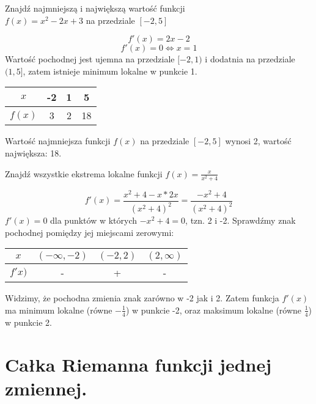 \documentclass[main.tex]{subfiles}
\begin{document}
    \begin{exercise}
        Znajdź najmniejszą i największą wartość funkcji\\ $f(x) = x^2 - 2x + 3$ na przedziale $[-2, 5]$
    \end{exercise}

    \[f'(x) = 2x - 2\]
    \[f'(x) = 0 \Leftrightarrow x = 1\]
    Wartość pochodnej jest ujemna na przedziale $[-2, 1)$ i dodatnia na przedziale $(1, 5]$, zatem istnieje minimum lokalne w punkcie 1.

    \begin{center}
        \begin{tabular}{c||c|c|c}
            $x$ & -2 & 1 & 5 \\
            \hline
            $f(x)$ & 3 & 2 & 18 \\
        \end{tabular}
    \end{center}

    Wartość najmniejsza funkcji $f(x)$ na przedziale $[-2, 5]$ wynosi 2, wartość największa: 18.


    \begin{exercise}
        Znajdź wszystkie ekstrema lokalne funkcji $f(x) = \frac{x}{x^2 + 4}$
    \end{exercise}

    \[f'(x) = \frac{x^2 + 4 - x * 2x}{(x^2 + 4)^2} = \frac{-x^2 + 4}{(x^2 + 4)^2}\]
    $f'(x) = 0$ dla punktów w których $-x^2 + 4 = 0$, tzn. 2 i -2. Sprawdźmy znak pochodnej pomiędzy jej miejscami zerowymi:

    \begin{center}
        \begin{tabular}{c||c|c|c}
            $x$ &$(-\infty, -2)$ & $(-2, 2)$ & $(2, \infty)$ \\
            \hline
            $f'x)$ & - & + & -
        \end{tabular}
    \end{center}

    Widzimy, że pochodna zmienia znak zarówno w -2 jak i 2. Zatem funkcja $f'(x)$ ma minimum lokalne
    (równe $-\frac{1}{4}$) w punkcie -2, oraz maksimum lokalne (równe $\frac{1}{4}$) w punkcie 2.

    \newpage

    \section{Całka Riemanna funkcji jednej zmiennej.}
\end{document}
